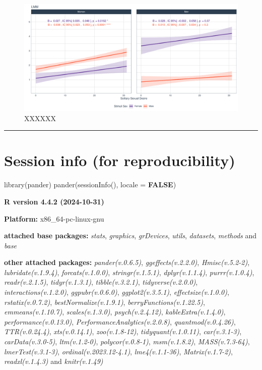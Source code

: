 \documentclass[
  bookmarksnumbered]{article}
\newenvironment{Shaded}{\begin{snugshade}}{\end{snugshade}}
\newcommand{\AttributeTok}[1]{\textcolor[rgb]{0.80,0.80,0.80}{#1}}
\newcommand{\ConstantTok}[1]{\textcolor[rgb]{0.86,0.64,0.64}{\textbf{#1}}}
\newcommand{\FunctionTok}[1]{\textcolor[rgb]{0.94,0.94,0.56}{#1}}
\newcommand{\NormalTok}[1]{\textcolor[rgb]{0.80,0.80,0.80}{#1}}
\begin{document}
\begin{figure}
\centering
\includegraphics{Sexual_Desire_Arousal_V2_files/figure-latex/fig-h2a-1.pdf}
\caption{\label{fig:fig-h2a}XXXXXX}
\end{figure}

\begin{center}\rule{0.5\linewidth}{0.5pt}\end{center}

\section{Session info (for reproducibility)}\label{session}

\begin{Shaded}
\begin{Highlighting}[]
\FunctionTok{library}\NormalTok{(pander)}
\FunctionTok{pander}\NormalTok{(}\FunctionTok{sessionInfo}\NormalTok{(), }\AttributeTok{locale =} \ConstantTok{FALSE}\NormalTok{)}
\end{Highlighting}
\end{Shaded}

\textbf{R version 4.4.2 (2024-10-31)}

\textbf{Platform:} x86\_64-pc-linux-gnu

\textbf{attached base packages:}
\emph{stats}, \emph{graphics}, \emph{grDevices}, \emph{utils}, \emph{datasets}, \emph{methods} and \emph{base}

\textbf{other attached packages:}
\emph{pander(v.0.6.5)}, \emph{ggeffects(v.2.2.0)}, \emph{Hmisc(v.5.2-2)}, \emph{lubridate(v.1.9.4)}, \emph{forcats(v.1.0.0)}, \emph{stringr(v.1.5.1)}, \emph{dplyr(v.1.1.4)}, \emph{purrr(v.1.0.4)}, \emph{readr(v.2.1.5)}, \emph{tidyr(v.1.3.1)}, \emph{tibble(v.3.2.1)}, \emph{tidyverse(v.2.0.0)}, \emph{interactions(v.1.2.0)}, \emph{ggpubr(v.0.6.0)}, \emph{ggplot2(v.3.5.1)}, \emph{effectsize(v.1.0.0)}, \emph{rstatix(v.0.7.2)}, \emph{bestNormalize(v.1.9.1)}, \emph{berryFunctions(v.1.22.5)}, \emph{emmeans(v.1.10.7)}, \emph{scales(v.1.3.0)}, \emph{psych(v.2.4.12)}, \emph{kableExtra(v.1.4.0)}, \emph{performance(v.0.13.0)}, \emph{PerformanceAnalytics(v.2.0.8)}, \emph{quantmod(v.0.4.26)}, \emph{TTR(v.0.24.4)}, \emph{xts(v.0.14.1)}, \emph{zoo(v.1.8-12)}, \emph{tidyquant(v.1.0.11)}, \emph{car(v.3.1-3)}, \emph{carData(v.3.0-5)}, \emph{ltm(v.1.2-0)}, \emph{polycor(v.0.8-1)}, \emph{msm(v.1.8.2)}, \emph{MASS(v.7.3-64)}, \emph{lmerTest(v.3.1-3)}, \emph{ordinal(v.2023.12-4.1)}, \emph{lme4(v.1.1-36)}, \emph{Matrix(v.1.7-2)}, \emph{readxl(v.1.4.3)} and \emph{knitr(v.1.49)}
\end{document}
